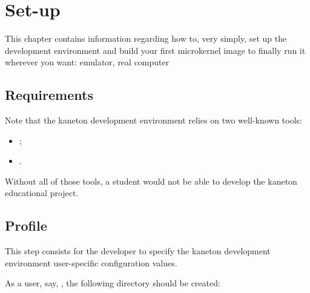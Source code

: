 %
%
%
%
%
%

%
%

\chapter{Set-up}
\label{chapter:setup}

This chapter contains information regarding how to, very simply, set up the
 development environment and build your first microkernel image
to finally run it wherever you want: emulator, real computer \etc{}

\newpage

%
%

%
%

\section{Requirements}

Note that the kaneton development environment relies on two well-known tools:

\begin{itemize}
  \item
    ;
  \item
    .
\end{itemize}

Without all of those tools, a student would not be able to develop the
kaneton educational project.

%
%

\section{Profile}

This step consists for the developer to specify the kaneton development
environment user-specific configuration values.

As a user, say, , the following directory should be created:

\begin{center}
\end{center}

